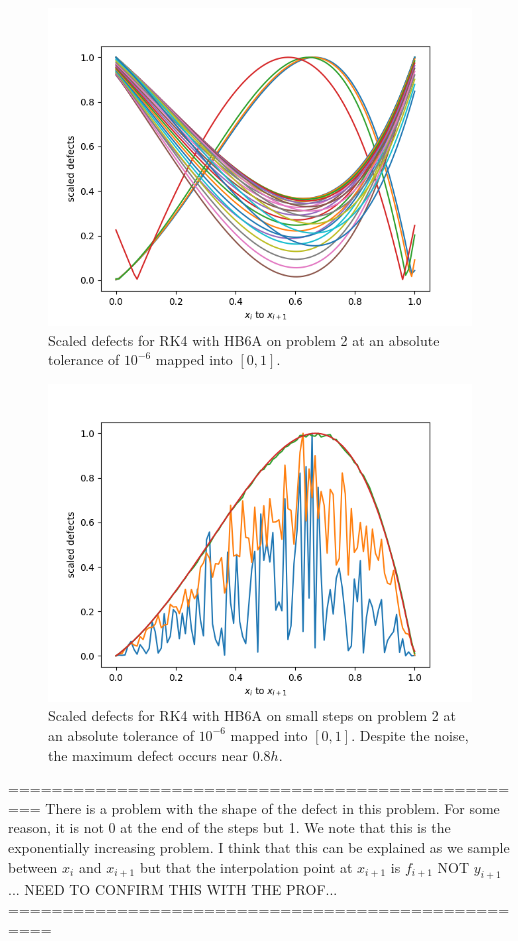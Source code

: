 \begin{figure}[H]
\centering
\includegraphics[width=0.7\linewidth]{./figures/rk4_with_hb6_asympt_p2_scaled_defects}
\caption{Scaled defects for RK4 with HB6A on problem 2 at an absolute tolerance of $10^{-6}$ mapped into $[0, 1]$.}
\label{fig:rk4_with_hb6_asympt_p2_scaled_defects}
\end{figure}

\begin{figure}[H]
\centering
\includegraphics[width=0.7\linewidth]{./figures/rk4_with_hb6_asympt_p2_scaled_defects_small_steps}
\caption{Scaled defects for RK4 with HB6A on small steps on problem 2 at an absolute tolerance of $10^{-6}$ mapped into $[0, 1]$. Despite the noise, the maximum defect occurs near $0.8h$.}
\label{fig:rk4_with_hb6_asympt_p2_scaled_defects_small_steps}
\end{figure}

=================================================
There is a problem with the shape of the defect in this problem. For some reason, it is not 0 at the end of the steps but 1. We note that this is the exponentially increasing problem.
I think that this can be explained as we sample between $x_i$ and $x_{i+1}$ but that the interpolation point at $x_{i + 1}$ is $f_{i + 1}$ NOT $y_{i + 1}$... NEED TO CONFIRM THIS WITH THE PROF... 
==================================================


